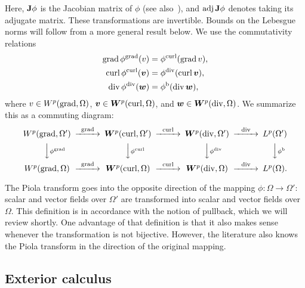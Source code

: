 \documentclass[10pt,a4paper]{article}
\begin{document}
Here, ${\mathbf{J}}\phi$ is the Jacobian matrix of $\phi$ (see also~\cite[Definition~9.8]{ern2021finite}), and $\operatorname{adj}{\mathbf{J}}\phi$ denotes taking its adjugate matrix.
These transformations are invertible. 
Bounds on the Lebesgue norms will follow from a more general result below. 
We use the commutativity relations 
\begin{subequations}\label{eq_piola_commute}
\begin{align}
    \operatorname{grad} \phi^{\operatorname{grad}} (v) &= \phi^{\operatorname{curl}}(\operatorname{grad} v), 
    \\
    \operatorname{curl} \phi^{\operatorname{curl}}(\bm{v}) &= \phi^{\operatorname{div}}(\operatorname{curl} \bm{v}), 
    \\
    \operatorname{div} \phi^{\operatorname{div}}(\bm{w}) &= \phi^{\rm b}(\operatorname{div} \bm{w}),
\end{align}
\end{subequations}
where $v \in W^{p}(\operatorname{grad},\Omega)$, $\bm{v} \in \bm{W}^{p}(\operatorname{curl},\Omega)$, and $\bm{w} \in \bm{W}^{p}(\operatorname{div},\Omega)$.  
We summarize this as a commuting diagram:
\begin{align*}
    \begin{CD}
        W^{p}(\grad,\Omega') @>{\grad}>> \bfW^{p}(\curl,\Omega') @>{\curl}>> \bfW^{p}(\divergence,\Omega') @>{\divergence}>> L^{p}(\Omega')
        \\
        @VV{\phi^{\grad}}V 
        @VV{\phi^{\curl}}V 
        @VV{\phi^{\divergence}}V 
        @VV{\phi^{\rm b}}V 
        \\
        W^{p}(\grad,\Omega ) @>{\grad}>> \bfW^{p}(\curl,\Omega ) @>{\curl}>> \bfW^{p}(\divergence,\Omega ) @>{\divergence}>> L^{p}(\Omega ).
    \end{CD}
\end{align*}

\begin{remark}
    The Piola transform goes into the opposite direction of the mapping $\phi : \Omega \rightarrow \Omega'$:
    scalar and vector fields over $\Omega'$ are transformed into scalar and vector fields over $\Omega$.
    This definition is in accordance with the notion of pullback, which we will review shortly. 
    One advantage of that definition is that it also makes sense whenever the transformation is not bijective. 
    However, the literature also knows the Piola transform in the direction of the original mapping. 
\end{remark}


\subsection{Exterior calculus}
\end{document}
